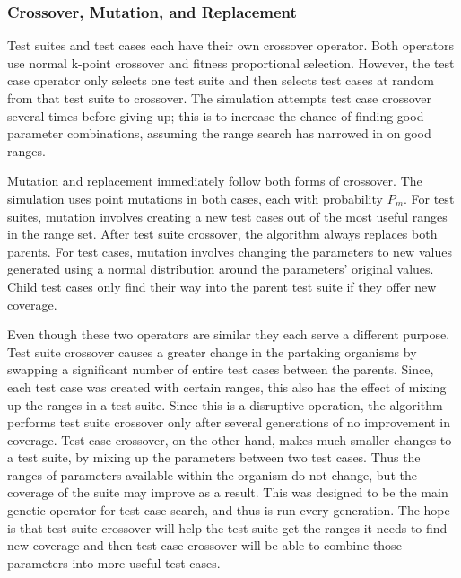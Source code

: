 \documentclass[runningheads]{llncs}
\begin{document}
\subsubsection{Crossover, Mutation, and Replacement}

Test suites and test cases each have their own crossover operator. Both operators use normal k-point crossover and fitness proportional selection. However, the test case operator only selects one test suite and then selects test cases at random from that test suite to crossover. The simulation attempts test case crossover several times before giving up; this is to increase the chance of finding good parameter combinations, assuming the range search has narrowed in on good ranges.

Mutation and replacement immediately follow both forms of crossover. The simulation uses point mutations in both cases, each with probability $P_m$. For test suites, mutation involves creating a new test cases out of the most useful ranges in the range set. After test suite crossover, the algorithm always replaces both parents. For test cases, mutation involves changing the parameters to new values generated using a normal distribution around the parameters' original values. Child test cases only find their way into the parent test suite if they offer new coverage. 

Even though these two operators are similar they each serve a different purpose. Test suite crossover causes a greater change in the partaking organisms by swapping a significant number of entire test cases between the parents. Since, each test case was created with certain ranges, this also has the effect of mixing up the ranges in a test suite. Since this is a disruptive operation, the algorithm performs test suite crossover only after several generations of no improvement in coverage. Test case crossover, on the other hand, makes much smaller changes to a test suite, by mixing up the parameters between two test cases. Thus the ranges of parameters available within the organism do not change, but the coverage of the suite may improve as a result. This was designed to be the main genetic operator for test case search, and thus is run every generation. The hope is that test suite crossover will help the test suite get the ranges it needs to find new coverage and then test case crossover will be able to combine those parameters into more useful test cases.
\end{document}
